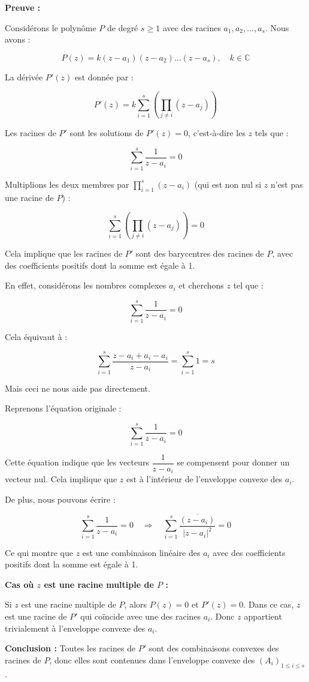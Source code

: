 \documentclass[a4paper,12pt]{article}
\begin{document}
\begin{solutionbox}
\textbf{Preuve :}

Considérons le polynôme \( P \) de degré \( s \geq 1 \) avec des racines \( a_1, a_2, \dots, a_s \). Nous avons :

\[
P(z) = k (z - a_1)(z - a_2) \dots (z - a_s), \quad k \in \mathbb{C}
\]

La dérivée \( P'(z) \) est donnée par :

\[
P'(z) = k \sum_{i=1}^{s} \left( \prod_{j \ne i} (z - a_j) \right)
\]

Les racines de \( P' \) sont les solutions de \( P'(z) = 0 \), c'est-à-dire les \( z \) tels que :

\[
\sum_{i=1}^{s} \dfrac{1}{z - a_i} = 0
\]

Multiplions les deux membres par \( \prod_{i=1}^{s} (z - a_i) \) (qui est non nul si \( z \) n'est pas une racine de \( P \)) :

\[
\sum_{i=1}^{s} \left( \prod_{j \ne i} (z - a_j) \right) = 0
\]

Cela implique que les racines de \( P' \) sont des barycentres des racines de \( P \), avec des coefficients positifs dont la somme est égale à 1.

En effet, considérons les nombres complexes \( a_i \) et cherchons \( z \) tel que :

\[
\sum_{i=1}^{s} \dfrac{1}{z - a_i} = 0
\]

Cela équivaut à :

\[
\sum_{i=1}^{s} \dfrac{z - a_i + a_i - a_i}{z - a_i} = \sum_{i=1}^{s} 1 = s
\]

Mais ceci ne nous aide pas directement. 

Reprenons l'équation originale :

\[
\sum_{i=1}^{s} \dfrac{1}{z - a_i} = 0
\]

Cette équation indique que les vecteurs \( \dfrac{1}{z - a_i} \) se compensent pour donner un vecteur nul. Cela implique que \( z \) est à l'intérieur de l'enveloppe convexe des \( a_i \).

De plus, nous pouvons écrire :

\[
\sum_{i=1}^{s} \dfrac{1}{z - a_i} = 0 \quad \Rightarrow \quad \sum_{i=1}^{s} \dfrac{\overline{(z - a_i)}}{|z - a_i|^2} = 0
\]

Ce qui montre que \( z \) est une combinaison linéaire des \( a_i \) avec des coefficients positifs dont la somme est égale à 1.

\textbf{Cas où \( z \) est une racine multiple de \( P \) :}

Si \( z \) est une racine multiple de \( P \), alors \( P(z) = 0 \) et \( P'(z) = 0 \). Dans ce cas, \( z \) est une racine de \( P' \) qui coïncide avec une des racines \( a_i \). Donc \( z \) appartient trivialement à l'enveloppe convexe des \( a_i \).

\textbf{Conclusion :} Toutes les racines de \( P' \) sont des combinaisons convexes des racines de \( P \), donc elles sont contenues dans l'enveloppe convexe des \( (A_i)_{1 \leq i \leq s} \).

\end{solutionbox}
\end{document}
